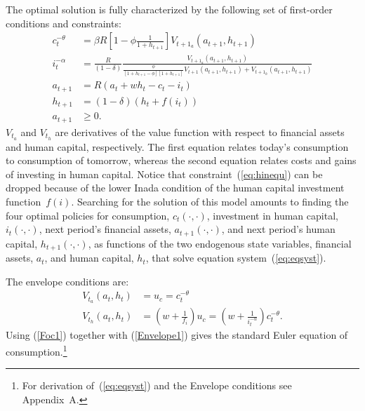 \documentclass[a4paper,12pt]{article}%
\begin{document}
The optimal solution is fully characterized by the following set of first-order conditions and constraints:
\begin{subequations}
\label{eq:eqsyst}
\begin{align}
c_{t}^{-\theta}  &  = \beta R \left[ 1-\phi\frac{1}{1+h_{t+1}}\right] \text{$V_{t+1_{a}}$}\left( a_{t+1},h_{t+1}\right) \label{Foc1} \\
i_{t}^{-\alpha}  &  = \frac{R}{\left( 1-\delta\right)} \frac{\text{$V_{t+1_{a}}$}\left( a_{t+1},h_{t+1}\right)}{\frac{\phi}{\left[1+h_{t+1}-\phi\right]  \left[ 1+h_{t+1}\right]}V_{t+1}\left(a_{t+1},h_{t+1}\right) +\text{$V_{t+1_{h}}$}\left( a_{t+1},h_{t+1}\right)} \label{Foc2} \\
a_{t+1}  &  = R \left( a_{t}+wh_{t}-c_{t}-i_{t}\right) \\
h_{t+1}  &  = \left( 1-\delta\right) \left( h_{t}+f\left( i_{t}\right)\right) \\
a_{t+1}  &  \geq0.
\end{align}
\end{subequations}
$V_{t_{a}}$ and $V_{t_{h}}$ are derivatives of the value function with respect to financial assets and human capital, respectively. The first equation relates today's consumption to consumption of tomorrow, whereas the second equation relates costs and gains of investing in human capital. Notice that constraint~(\ref{eq:hinequ}) can be dropped because of the lower Inada condition of the human capital investment function~$f(i)$. Searching for the solution of this model amounts to finding the four optimal policies for consumption, $c_{t}\left( \cdot,\cdot\right)$, investment in human capital, $i_{t}\left( \cdot,\cdot\right)$, next period's financial assets, $a_{t+1}\left( \cdot,\cdot\right)$, and next period's human capital, $h_{t+1}\left(  \cdot,\cdot\right)$, as functions of the two endogenous state variables, financial assets, $a_{t}$, and human capital, $h_{t}$, that solve equation system~(\ref{eq:eqsyst}).

The envelope conditions are:
\begin{subequations}
\begin{align}
\text{$V_{t_{a}}$}\left( a_{t},h_{t}\right)  &  =u_{c}=c_{t}^{-\theta} \label{Envelope1}\\
\text{$V_{t_{h}}$}\left( a_{t},h_{t}\right)  &  =\left( w+\frac{1}{f_{i}}\right) u_{c}=\left( w+\frac{1}{i_{t}^{-\alpha}}\right) c_{t}^{-\theta}\text{.} \label{Envelope2}
\end{align}
\end{subequations}
Using (\ref{Foc1}) together with (\ref{Envelope1}) gives the standard Euler equation of consumption.\footnote{For derivation of~(\ref{eq:eqsyst}) and the Envelope conditions see Appendix~A.}
\end{document}
